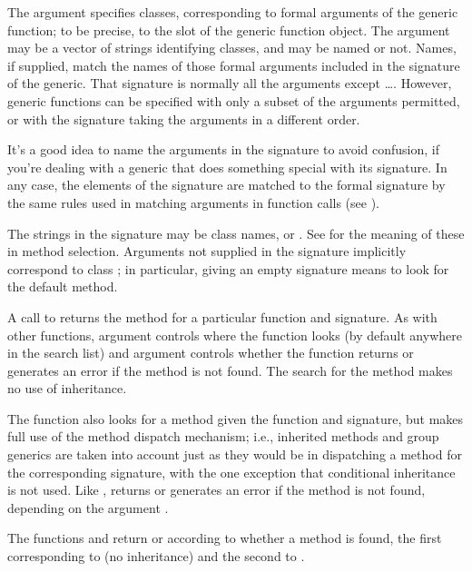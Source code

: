\begin{Details}\relax
The  argument specifies classes, corresponding to formal arguments of the generic function; to be precise, to the  slot of the generic function object.
The argument may be a vector of strings identifying
classes, and may be named or not.  Names, if supplied, match the
names of those formal arguments included in the signature of the
generic.  That signature is normally all the arguments except
\dots.  However, generic functions can be specified with only a
subset of the arguments permitted, or with the signature taking
the arguments in a different order.

It's a good idea to name the arguments in the signature to avoid
confusion, if you're dealing with a generic that does something
special with its signature.   In any case, the elements of the
signature are matched to the formal signature by the same rules
used in matching arguments in function calls (see
).

The strings in the signature may be class names, 
or .  See  for the meaning of these in
method selection.  Arguments not supplied in the signature
implicitly correspond to class ; in particular, giving
an empty signature means to look for the default method.

A call to  returns the method for a particular
function and signature.  As with other  functions,
argument  controls where the function looks (by default
anywhere in the search list) and argument  controls
whether the function returns  or generates an error if
the method is not found.  The search for the method makes no use of
inheritance.

The function  also looks for a method given the
function and signature, but makes full use of the method dispatch
mechanism; i.e., inherited methods and group generics are taken into
account just as they would be in dispatching a method for the
corresponding signature, with the one exception that conditional
inheritance is not used.  Like , 
returns  or generates an error if
the method is not found, depending on the argument .

The functions  and  return
 or  according to whether a method is found,
the first corresponding to  (no inheritance) and the
second to .

\end{Details}
